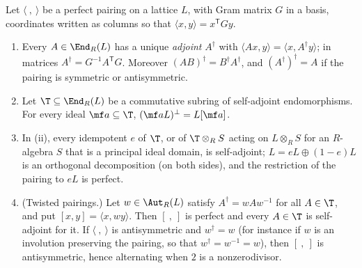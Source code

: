 \begin{proposition}[adjoints]\label{prop:modules:adjoint}
Let $\langle\ ,\ \rangle$ be a perfect pairing on a lattice $L$, with Gram matrix $G$ in a basis, coordinates written as columns so that
$\langle x,y\rangle=x^{\mathsf T}Gy$.
\begin{enumerate}[label=(\roman*)]
\item Every $A\in\End_R(L)$ has a unique \emph{adjoint} $A^\dagger$ with $\langle Ax,y\rangle=\langle x,A^\dagger y\rangle$; in matrices $A^\dagger=G^{-1}A^{\mathsf T}G$. Moreover
$(AB)^\dagger=B^\dagger A^\dagger$, and $(A^\dagger)^\dagger=A$ if the pairing is symmetric or antisymmetric.
\item Let $\T\subseteq\End_R(L)$ be a commutative subring of self-adjoint endomorphisms. For every ideal $\mf a\subseteq\T$, $(\mf aL)^\perp=L[\mf a]$.
\item In (ii), every idempotent $e$ of $\T$, or of $\T\otimes_RS$ acting on $L\otimes_RS$ for an $R$-algebra $S$ that is a principal ideal domain, is self-adjoint;
$L=eL\oplus(1-e)L$ is an orthogonal decomposition (on both sides), and the restriction of the pairing to $eL$ is perfect.
\item (Twisted pairings.) Let $w\in\Aut_R(L)$ satisfy $A^\dagger=wAw^{-1}$ for all $A\in\T$, and put $[x,y]=\langle x,wy\rangle$. Then $[\ ,\ ]$ is perfect and every
$A\in\T$ is self-adjoint for it. If $\langle\ ,\ \rangle$ is antisymmetric and $w^\dagger=w$ (for instance if $w$ is an involution preserving the pairing, so that
$w^\dagger=w^{-1}=w$), then $[\ ,\ ]$ is antisymmetric, hence alternating when $2$ is a nonzerodivisor.
\end{enumerate}
\end{proposition}

